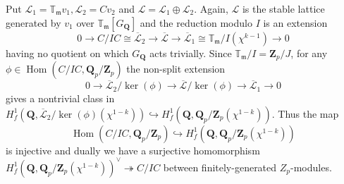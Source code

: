 \documentclass[11pt]{amsart}
\newcommand{\Q}{\mathbf{Q}}  %
\newcommand{\Z}{\mathbf{Z}}  %
\newcommand{\Hom}{\operatorname{Hom}}
\theoremstyle{definition}
\theoremstyle{definition}
\theoremstyle{definition}
\theoremstyle{definition}
\theoremstyle{definition}
\theoremstyle{definition}
\begin{document}
Put $\mathcal{L}_1=\mathbb{T}_\mathfrak{m} v_1, \mathcal{L}_2=C v_2$ and $\mathcal{L}=\mathcal{L}_1\oplus\mathcal{L}_2$.
Again, $\mathcal{L}$ is the stable lattice generated by $v_1$ over $\mathbb{T}_\mathfrak{m}[G_\Q]$ and
the reduction modulo $I$ is an extension
\begin{equation*}
    0\to C/IC\cong \overline{\mathcal{L}}_2 \to\overline{\mathcal{L}}
    \to \overline{\mathcal{L}}_1\cong \mathbb{T}_\mathfrak{m}/I(\chi^{k-1})\to 0
\end{equation*}
having no quotient on which $G_\Q$ acts trivially. 
Since $\mathbb{T}_\mathfrak{m}/I=\Z_p/J$,
for any $\phi\in \Hom(C/IC, \Q_p/\Z_p)$
the non-split extension
\begin{equation*}
    0\to \overline{\mathcal{L}}_2/\ker(\phi) \to \overline{\mathcal{L}}/\ker(\phi)\to \overline{\mathcal{L}}_1\to 0
\end{equation*}
gives a nontrivial class in $H_f^1(\Q, \overline{\mathcal{L}}_2/\ker(\phi)(\chi^{1-k}))\hookrightarrow 
H_f^1(\Q, \Q_p/\Z_p(\chi^{1-k}))$.
Thus the map 
\begin{equation*}
    \Hom(C/IC, \Q_p/\Z_p)\hookrightarrow H^1_f(\Q, \Q_p/\Z_p(\chi^{1-k}))
\end{equation*}
is injective and dually we have a
surjective homomorphism
$H^1_f(\Q, \Q_p/\Z_p(\chi^{1-k}))^\vee\twoheadrightarrow C/IC$
between finitely-generated $Z_p$-modules.
\end{document}
